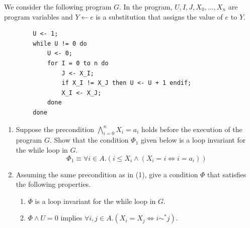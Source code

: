 \documentclass[10pt,a4paper]{article}
\begin{document}
\begin{enumerate}[label=\fbox{\arabic*}]
        We consider the following program $G$. In the program, $U, I, J, X_0, \dots, X_n$ are program variables and $Y \leftarrow e$ is a substitution that assigns the value of $e$ to $Y$.
        \begin{verbatim}
        U <- 1;
        while U != 0 do
            U <- 0;
            for I = 0 to n do
                J <- X_I;
                if X_I != X_J then U <- U + 1 endif;
                X_I <- X_J;
            done
        done
        \end{verbatim}
        \begin{enumerate}[label=(\arabic*)]
          \item Suppose the precondition $\bigwedge_{i=0}^n X_i = a_i$ holds before the execution of the program $G$. Show that the condition $\Phi_1$ given below is a loop invariant for the while loop in $G$.
          \[
            \Phi_1 \equiv \forall i \in A. (i \le X_i \land (X_i = i \Leftrightarrow i = a_i))
          \]
          \item Assuming the same precondition as in (1), give a condition $\Phi$ that satisfies the following properties.
          \begin{enumerate}
            \item[(a)] $\Phi$ is a loop invariant for the while loop in $G$.
            \item[(b)] $\Phi \land U = 0$ implies $\forall i, j \in A. (X_i = X_j \Leftrightarrow i \sim^* j)$.
          \end{enumerate}
        \end{enumerate}

\end{enumerate}

\newpage
\end{document}
